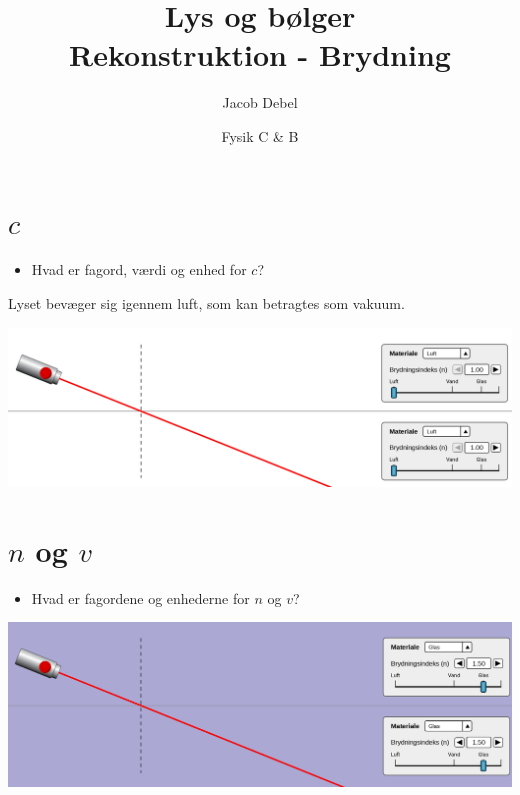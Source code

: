 \documentclass[a4paper, 12pt]{article}
\author{Jacob Debel}
\date{Fysik C \& B}
\title{Lys og bølger\\\medskip
\large Rekonstruktion - Brydning}
\begin{document}
\maketitle


\section*{\(c\)}
\label{sec:orgaaebbf1}
\begin{minipage}{0.3\linewidth}
\begin{itemize}
\item Hvad er fagord,  værdi og enhed for \(c\)?
\end{itemize}
\end{minipage}
\vline
\begin{minipage}{0.68\linewidth}
Lyset bevæger sig igennem luft, som kan betragtes som vakuum.
\begin{center}
\includegraphics[width=.9\linewidth]{./img/laser_luft_luft.png}
\end{center}
\end{minipage}

\vfill
\section*{\(n\) og \(v\)}
\label{sec:org46cef88}
\begin{minipage}{0.3\linewidth}
\begin{itemize}
\item Hvad er fagordene og enhederne for \(n\) og \(v\)?
\end{itemize}
\end{minipage}
\vline
\begin{minipage}{0.68\linewidth}
\begin{center}
\includegraphics[width=.9\linewidth]{./img/laser_glas_glas.png}
\end{center}
\end{minipage}
\end{document}
